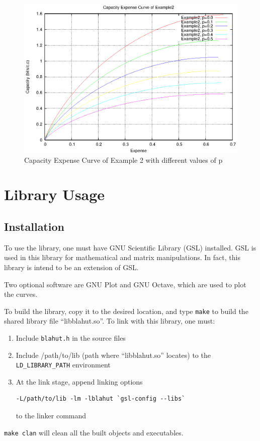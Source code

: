 \documentclass[a4paper,10pt]{article}
\begin{document}
\begin{figure}
 \centering
 \includegraphics[bb=50 50 410 302]{pic/example2_cap.eps}
 \caption{Capacity Expense Curve of Example 2 with different values of p}
 \label{fig:example2_cap}
\end{figure}

\section{Library Usage}
\label{Sec:Library_Use}
\subsection{Installation}
To use the library, one must have GNU Scientific Library (GSL) installed. GSL is used in this library for mathematical and matrix manipulations. In fact, this library is intend to be an extension of GSL. 

Two optional software are GNU Plot and GNU Octave, which are used to plot the curves.

To build the library, copy it to the desired location, and type \verb|make| to build the shared library file ``libblahut.so''. To link with this library, one must:
\begin{enumerate}
 \item Include \verb|blahut.h| in the source files
 \item Include /path/to/lib (path where ``libblahut.so'' locates) to the \verb|LD_LIBRARY_PATH| environment
 \item At the link stage, append linking options 
\begin{verbatim}
-L/path/to/lib -lm -lblahut `gsl-config --libs`
\end{verbatim}
 to the linker command
\end{enumerate}
\verb|make clan| will clean all the built objects and executables.
\end{document}
